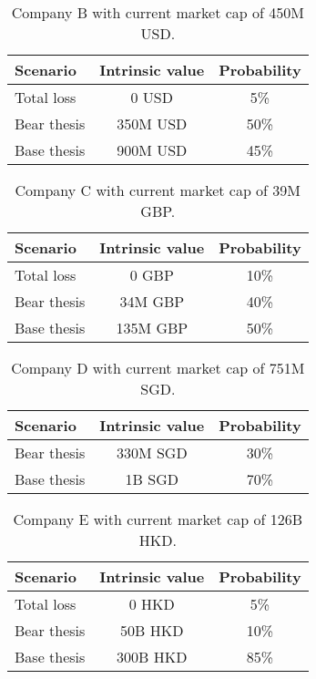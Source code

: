 \documentclass{article}
\begin{document}
\begin{table}[!ht]
\caption{Company B with current market cap of 450M USD.}
\vspace{0.25cm}
\centering
\begin{tabular}{l|c|c}
Scenario & Intrinsic value & Probability \\
\hline
Total loss& 0 USD & 5\% \\
Bear thesis & 350M USD & 50\% \\
Base thesis & 900M USD & 45\% \\
\end{tabular}%
\label{tab:companyB}%
\end{table}%

\begin{table}[!ht]
\caption{Company C with current market cap of 39M GBP.}
\vspace{0.25cm}
\centering
\begin{tabular}{l|c|c}
Scenario & Intrinsic value & Probability \\
\hline
Total loss & 0 GBP & 10\% \\
Bear thesis & 34M GBP & 40\% \\
Base thesis & 135M GBP & 50\% \\
\end{tabular}%
\label{tab:companyC}%
\end{table}%

\begin{table}[!ht]
\caption{Company D with current market cap of 751M SGD.}
\vspace{0.25cm}
\centering
\begin{tabular}{l|c|c}
Scenario & Intrinsic value & Probability \\
\hline
Bear thesis & 330M SGD & 30\% \\
Base thesis & 1B SGD & 70\% \\
\end{tabular}%
\label{tab:companyD}%
\end{table}%

\begin{table}[!ht]
\caption{Company E with current market cap of 126B HKD.}
\vspace{0.25cm}
\centering
\begin{tabular}{l|c|c}
Scenario & Intrinsic value & Probability \\
\hline
Total loss & 0 HKD & 5\% \\
Bear thesis & 50B HKD & 10\% \\
Base thesis & 300B HKD & 85\% \\
\end{tabular}%
\label{tab:companyE}%
\end{table}%
\end{document}
